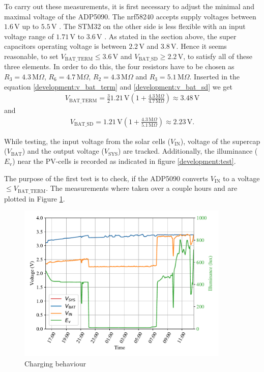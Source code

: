 To carry out these measurements, it is first necessary to adjust the minimal and maximal voltage of the ADP5090.
The nrf58240 accepts supply voltages between $1.6\,\text{V}$ up to $5.5\,\text{V}$ \cite{nrf}.
The STM32 on the other side is less flexible with an input voltage range of $1.71\,\text{V}$ to $3.6\,\text{V}$ \cite{stm32}.
As stated in the section above, the super capacitors operating voltage is between $2.2\,\text{V}$ and $3.8\,\text{V}$.
Hence it seems reasonable, to set $V_{\text{BAT\_TERM}} \le 3.6\,\text{V}$ and $V_{\text{BAT\_SD}} \ge 2.2\,\text{V}$, to satisfy all of these three elements.
In order to do this, the four resistors have to be chosen as $R_3 = 4.3\,\text{M}\Omega$, $R_6 = 4.7\,\text{M}\Omega$, $R_2 = 4.3\,\text{M}\Omega$ and $R_3 = 5.1\,\text{M}\Omega$.
Inserted in the equation \eqref{development:v_bat_term} and \eqref{development:v_bat_sd} we get
\begin{align}
	V_{\text{BAT\_TERM}}= \frac{3}{2} 1.21\,\text{V} \left(1 + \frac{4.3\,\text{M}\Omega}{4.7 \,\text{M}\Omega} \right) \approx 3.48\,\text{V} 
\end{align}
and
\begin{align}
	V_{\text{BAT\_SD}} = 1.21\,\text{V} \left(1 + \frac{4.3\,\text{M}\Omega}{5.1\,\text{M}\Omega} \right) \approx 2.23\,\text{V}. 
\end{align}

While testing, the input voltage from the solar cells ($V_{\text{IN}}$), voltage of the supercap ($V_{\text{BAT}}$) and the output voltage ($V_{\text{SYS}}$) are tracked. Additionally, the illuminance ($E_\text{v}$) near the PV-cells  is recorded as indicated in figure \ref{development:test}.

The purpose of the first test is to check, if the ADP5090 converts $V_{\text{IN}}$ to a voltage $\le V_{\text{BAT\_TERM}}$.
The measurements where taken over a couple hours and are plotted in Figure \ref{development:charge}.

\begin{figure}[ht]
	\centering
	\includegraphics[width=0.9\textwidth]{4-development/hardware/graphics/laden.pdf}
	\caption{Charging behaviour\label{development:charge}}
\end{figure}

